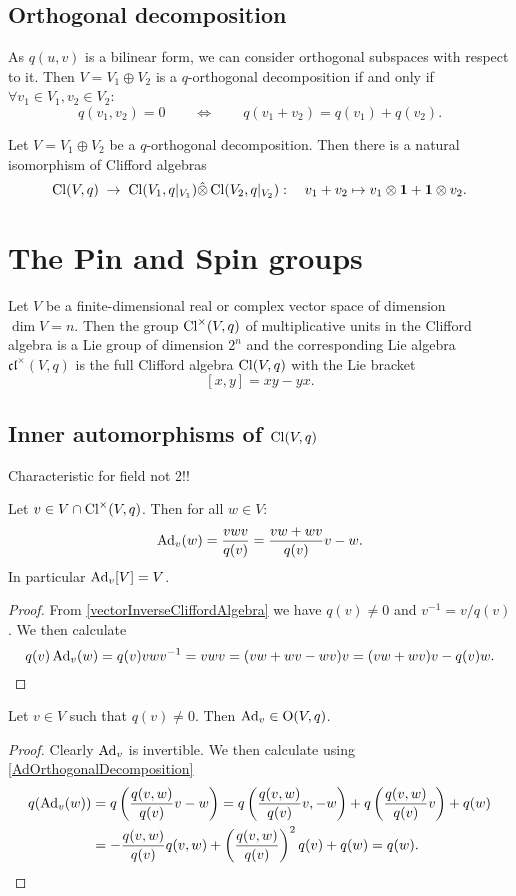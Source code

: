 \subsection{Orthogonal decomposition}
As $q(u,v)$ is a bilinear form, we can consider orthogonal subspaces with respect to it. Then $V=V_1\oplus V_2$ is a $q$-orthogonal decomposition if and only if $\forall v_1\in V_1, v_2\in V_2$:
\[ q(v_1,v_2) = 0 \qquad \iff \qquad q(v_1+v_2) = q(v_1) + q(v_2). \]
\begin{proposition}
Let $V=V_1\oplus V_2$ be a $q$-orthogonal decomposition. Then there is a natural isomorphism of Clifford algebras
\[ \operatorname{Cl}(V,q) \;\to\; \operatorname{Cl}(V_1,q|_{V_1}) \hat{\otimes} \operatorname{Cl}(V_2, q|_{V_2}):\quad v_1+v_2\mapsto v_1\otimes \boldsymbol{\mathrm{1}} + \boldsymbol{\mathrm{1}}\otimes v_2. \]
\end{proposition}

\section{The Pin and Spin groups}

\begin{proposition}
Let $V$ be a finite-dimensional real or complex vector space of dimension $\dim V = n$. Then the group $\operatorname{Cl}^\times(V,q)$ of multiplicative units in the Clifford algebra is a Lie group of dimension $2^n$ and the corresponding Lie algebra $\mathfrak{cl}^\times(V,q)$ is the full Clifford algebra $\operatorname{Cl}(V,q)$ with the Lie bracket
\[ [x,y] = xy - yx.  \]
\end{proposition}

\subsection{Inner automorphisms of $\operatorname{Cl}(V,q)$}
Characteristic for field not 2!!


\begin{proposition} \label{AdOrthogonalDecomposition}
Let $v\in V\cap \operatorname{Cl}^\times(V,q)$. Then for all $w\in V$:
\[ \operatorname{Ad}_v(w) = \frac{vwv}{q(v)} = \frac{vw+wv}{q(v)}v - w. \]
In particular $\operatorname{Ad}_v[V] = V$.
\end{proposition}
\begin{proof}
From \ref{vectorInverseCliffordAlgebra} we have $q(v)\neq 0$ and $v^{-1} = v/q(v)$.
We then calculate
\[ q(v)\operatorname{Ad}_v(w) = q(v)vwv^{-1} = vwv = (vw + wv - wv)v = (vw+wv)v - q(v)w. \]
\end{proof}

\begin{lemma} \label{AdOrthogonalMap}
Let $v\in V$ such that $q(v)\neq 0$. Then $\operatorname{Ad}_v\in \operatorname{O}(V,q)$.
\end{lemma}
\begin{proof}
Clearly $\operatorname{Ad}_v$ is invertible. We then calculate using \ref{AdOrthogonalDecomposition}
\begin{align*}
q(\operatorname{Ad}_v(w)) &= q\left(\frac{q(v,w)}{q(v)}v - w\right) = q\left(\frac{q(v,w)}{q(v)}v,-w\right) + q\left(\frac{q(v,w)}{q(v)}v\right) + q(w) \\
&= -\frac{q(v,w)}{q(v)}q(v,w)+\left(\frac{q(v,w)}{q(v)}\right)^2q(v) + q(w) = q(w).
\end{align*}
\end{proof}


